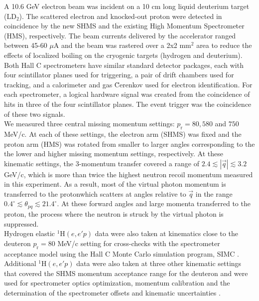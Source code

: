 \indent A 10.6 GeV electron beam was incident on a 10 cm long liquid deuterium target (LD$_{2}$). The scattered electron and knocked-out proton were detected in coincidence
by the new SHMS and the existing High Momentum Spectrometer (HMS), respectively. The beam currents delivered by the accelerator ranged between 45-60 $\mu$A and the beam was rastered over a 2x2 mm$^{2}$ area to reduce the effects of localized boiling on the cryogenic targets (hydrogen and deuterium).\\
\indent Both Hall C spectrometers have similar standard detector packages, each with four scintillator planes \cite{hodo_techreport} used for triggering, a pair of drift chambers \cite{dc_techreport} used for tracking, and a calorimeter \cite{Mkrtchyan_2013} and gas \u{C}erenkov \cite{Li_Wenliang_mthesis,ngc_techreport} used for electron identification.
For each spectrometer, a logical hardware signal was created from  the coincidence of hits in three of the four scintillator planes. The event trigger was the \DIFdelbegin {}\DIFdelend coincidence of these two signals. \\
\indent We measured three central missing momentum settings: $p_{\mathrm{r}}=80, 580$ and $750$ MeV/c. At each of these settings, the electron arm (SHMS) was fixed and the proton arm (HMS) was rotated from smaller to larger angles corresponding to the
the lower and higher missing momentum settings, respectively. At these kinematic settings, the 3-momentum transfer covered a range of $2.4\lesssim|\vec{q}|\lesssim3.2$ GeV/c, which is more than twice the highest neutron recoil momentum
measured in this experiment. As a result, most of the virtual photon momentum is transferred to the proton\DIFaddbegin \DIFadd{, }\DIFaddend which scatters at angles relative to $\vec{q}$ in the range $0.4^{\circ}\lesssim \theta_{pq}\lesssim21.4^{\circ}$.
At these forward angles and large momenta transferred to the proton, the  process where the neutron is struck by the virtual photon is suppressed.\\
\indent Hydrogen elastic $^{1}\mathrm{H}(e,e'p)$ data were also taken at kinematics close to the deuteron $p_{\mathrm{r}}=80$ MeV/c setting for cross-checks with the spectrometer acceptance model using the  Hall C Monte Carlo
simulation program, SIMC \cite{PhysRevC.64.054610}. Additional $^{1}\mathrm{H}(e,e'p)$ data were also taken at three other kinematic settings that covered the SHMS momentum acceptance range for the deuteron and were used for spectrometer optics optimization, 
momentum calibration and the determination of the spectrometer offsets and kinematic uncertainties \cite{cyero_phdthesis}.\\
